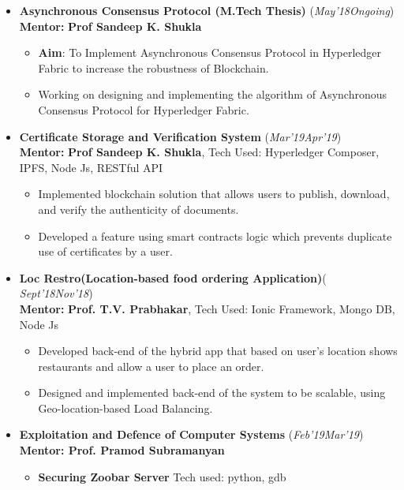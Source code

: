 \documentclass[10pt]{extarticle}
\begin{document}
\begin{itemize}
\item \textbf{Asynchronous Consensus Protocol (M.Tech Thesis)} \hfill\hfill(\textit{May'18\textendash     Ongoing})\\
\textbf{Mentor: }\textbf{Prof Sandeep K. Shukla } 
\begin{itemize}
\item \textbf{Aim}: To Implement Asynchronous Consensus Protocol in Hyperledger Fabric to increase the robustness of Blockchain.
\item %
Working on designing and implementing the algorithm of Asynchronous Consensus Protocol for Hyperledger Fabric.
\end{itemize}
\item \textbf{Certificate Storage and Verification System}  \hfill\hfill(\textit{Mar'19\textendash Apr'19})\\
\textbf{Mentor: }\textbf{Prof Sandeep K. Shukla}, Tech Used: Hyperledger Composer, IPFS, Node Js, RESTful API
\begin{itemize}
\item Implemented blockchain solution that allows users to publish, download, and verify the authenticity of documents.
\item Developed a feature using smart contracts logic which prevents duplicate use of certificates by a user. 
\end{itemize}
\item \textbf{Loc Restro(Location-based food ordering Application)}\hfill\hfill(\textit{ Sept'18\textendash Nov'18})\\ \textbf{Mentor: }\textbf{Prof. T.V. Prabhakar}, Tech Used: Ionic Framework, Mongo DB, Node Js
\begin{itemize}
\item Developed back-end of the hybrid app that based on user's location shows restaurants and allow a user to place an order.
\item Designed and implemented back-end of the system to be scalable, using Geo-location-based Load Balancing.
\end{itemize}
\item \textbf{Exploitation and Defence of Computer Systems} \hfill\hfill(\textit{Feb'19\textendash Mar'19})\\
\textbf{Mentor: Prof. Pramod Subramanyan}
\begin{itemize}
\item \textbf{Securing Zoobar Server} Tech used: python, gdb\\

\end{itemize}
\end{itemize}
\end{document}
